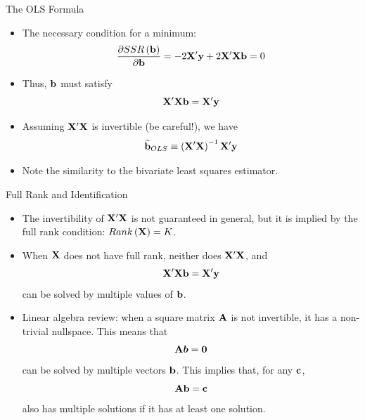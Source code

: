 \begin{frame}{The OLS Formula}
\begin{itemize}
	\item The necessary condition for a minimum:\[
	\frac{\partial SSR\left({\bf b}\right)}{\partial {\bf b}} = - 2 {\bf X}' {\bf y} + 2 {\bf X}'{\bf X} {\bf b} = 0 
	\]

	\item Thus, ${\bf b}$ must satisfy\[
	{\bf X}'{\bf X} {\bf b} =  {\bf X}' {\bf y} 
	\]


	\item Assuming ${\bf X}'{\bf X}$ is invertible (be careful!), we have\[
	\widehat{{\bf b}}_{OLS} \equiv  \left({\bf X}'{\bf X}\right)^{-1} {\bf X}' {\bf y} 
	\]

	\item Note the similarity to the bivariate least squares estimator. 

\end{itemize}
\end{frame}


\begin{frame}{Full Rank and Identification}
\begin{itemize}
	\item The invertibility of ${\bf X}'{\bf X}$ is not guaranteed in general, but
	it is implied by the full rank condition: $Rank\left({\bf X}\right) = K$.

	\item When ${\bf X}$ does not have full rank, neither does ${\bf X}'{\bf X}$, and \[
	{\bf X}'{\bf X} {\bf b} =  {\bf X}' {\bf y} 
	\]
	can be solved by multiple values of ${\bf b}$. 

	\item Linear algebra review: when a square matrix ${\bf A}$ is not invertible, 
	it has a non-trivial nullspace. This means that \[
	{\bf A} \boldsymbol{b} =  {\bf 0}
	\]
	can be solved by multiple vectors ${\bf b}$. This implies that, for any ${\bf c} $,
	\[
	{\bf A} {\bf b} =  {\bf c} 
	\]
	also has multiple solutions if it has at least one solution. 
	

\end{itemize}
\end{frame}


